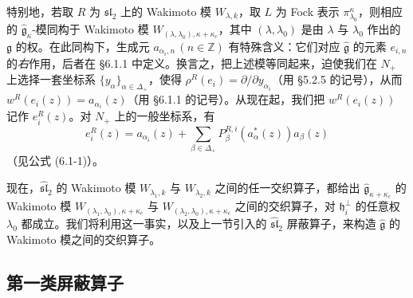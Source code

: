 特别地，若取 $R$ 为 $\mathfrak{sl}_2$ 上的 Wakimoto 模 $W_{\lambda,k}$，取 $L$ 为 Fock 表示 $\pi_{\lambda_0}^\kappa$，则相应的 $\hat{\mathfrak{g}}_\kappa$-模同构于 Wakimoto 模 $W_{(\lambda,\lambda_0),\kappa+\kappa_c}$，其中 $(\lambda,\lambda_0)$ 是由 $\lambda$ 与 $\lambda_0$ 作出的 $\mathfrak{g}$ 的权。在此同构下，生成元 $a_{\alpha_i,n}\,(n\in\mathbb{Z})$ 有特殊含义：它们对应 $\hat{\mathfrak{g}}$ 的元素 $e_{i,n}$ 的\emph{右}作用，后者在 §6.1.1 中定义。换言之，把上述模等同起来，迫使我们在 $N_+$ 上选择一套坐标系 $\{y_\alpha\}_{\alpha\in\Delta_+}$，使得 $\rho^R(e_i)=\partial/\partial y_{\alpha_i}$（用 §5.2.5 的记号），从而 $w^R(e_i(z))=a_{\alpha_i}(z)$（用 §6.1.1 的记号）。从现在起，我们把 $w^R(e_i(z))$ 记作 $e_i^R(z)$。对 $N_+$ 上的一般坐标系，有
\begin{equation}
    e_i^R(z)=a_{\alpha_i}(z)+\sum_{\beta\in\Delta_+}P_\beta^{R,i}(a_\alpha^*(z))a_\beta(z)
    \tag{7.3-2}
\end{equation}
（见公式 (6.1-1)）。

现在，$\widehat{\mathfrak{sl}}_2$ 的 Wakimoto 模 $W_{\lambda_1,k}$ 与 $W_{\lambda_2,k}$ 之间的任一交织算子，都给出 $\hat{\mathfrak{g}}_{\kappa+\kappa_c}$ 的 Wakimoto 模 $W_{(\lambda_1,\lambda_0),\kappa+\kappa_c}$ 与 $W_{(\lambda_2,\lambda_0),\kappa+\kappa_c}$ 之间的交织算子，对 $\mathfrak{h}_i^\perp$ 的任意权 $\lambda_0$ 都成立。我们将利用这一事实，以及上一节引入的 $\widehat{\mathfrak{sl}}_2$ 屏蔽算子，来构造 $\hat{\mathfrak{g}}$ 的 Wakimoto 模之间的交织算子。


\subsection{第一类屏蔽算子}

